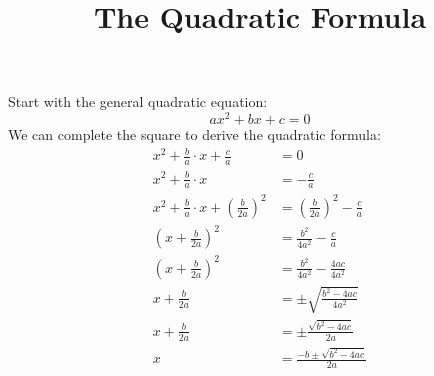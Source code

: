 \documentclass {article}
\title {The Quadratic Formula}
\date  {}
\begin{document}
    \maketitle 
    Start with the general quadratic equation:
    \[ ax^2 + bx + c = 0 \]
    We can complete the square to derive the quadratic formula:
    \begin {align*}
        x^2 + \frac{b}{a} \cdot x + \frac{c}{a} &= 0 \\
        x^2 + \frac{b}{a} \cdot x &= -\frac{c}{a} \\
        x^2 + \frac{b}{a} \cdot x + \left( \frac{b}{2a} \right)^2 &= \left( \frac{b}{2a} \right)^2 - \frac{c}{a} \\
        \left( x + \frac{b}{2a} \right)^2 &= \frac{b^2}{4a^2} - \frac{c}{a} \\
        \left( x + \frac{b}{2a} \right)^2 &= \frac{b^2}{4a^2} - \frac{4ac}{4a^2} \\
        x + \frac{b}{2a} &= \pm \sqrt{\frac{b^2 - 4ac}{4a^2}} \\
        x + \frac{b}{2a} &= \pm \frac{\sqrt{b^2 - 4ac}}{2a} \\
        x &= \frac{-b \pm \sqrt{b^2 - 4ac}}{2a}
    \end {align*}
\end{document}

